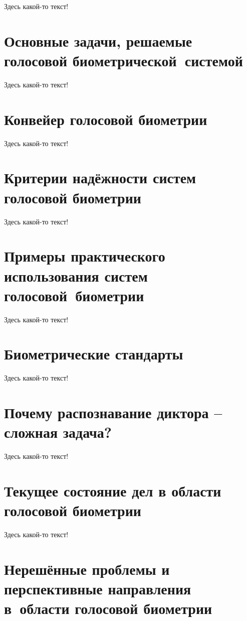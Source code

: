 \documentclass[12pt]{book}
\begin{document}
{\large{Здесь какой-то текст!}

\section{Основные задачи, решаемые голосовой биометрической~системой}

\large{Здесь какой-то текст!}

\section{Конвейер голосовой биометрии}

\large{Здесь какой-то текст!}

\section{Критерии надёжности систем голосовой биометрии}

\large{Здесь какой-то текст!}

\section{Примеры практического использования систем голосовой~биометрии}

\large{Здесь какой-то текст!}

\section{Биометрические стандарты}

\large{Здесь какой-то текст!}

\section{Почему распознавание диктора -- сложная задача?}

\large{Здесь какой-то текст!}

\section{Текущее состояние дел в области голосовой биометрии}

\large{Здесь какой-то текст!}

\section{Нерешённые проблемы и перспективные направления в~области голосовой биометрии}

}
\end{document}
